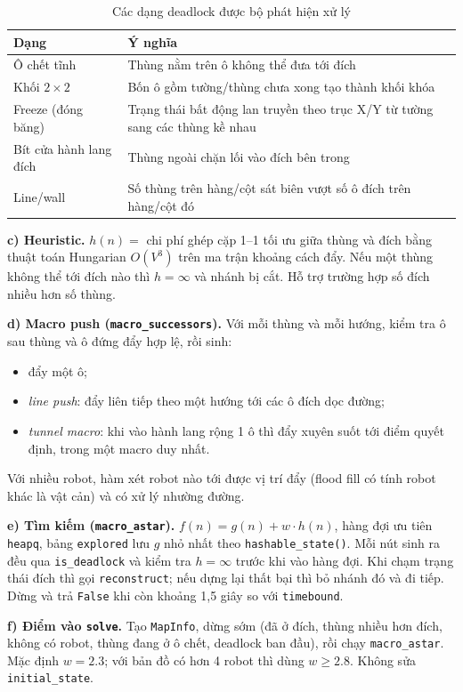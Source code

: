 \documentclass[a4paper,12pt]{article}
\begin{document}
\begin{table}[H]
\centering
\begin{tabularx}{\textwidth}{lX}
\toprule
\textbf{Dạng} & \textbf{Ý nghĩa} \\
\midrule
Ô chết tĩnh & Thùng nằm trên ô không thể đưa tới đích \\
Khối $2\times 2$ & Bốn ô gồm tường/thùng chưa xong tạo thành khối khóa \\
Freeze (đóng băng) & Trạng thái bất động lan truyền theo trục X/Y từ tường sang các thùng kề nhau \\
Bít cửa hành lang đích & Thùng ngoài chặn lối vào đích bên trong \\
Line/wall & Số thùng trên hàng/cột sát biên vượt số ô đích trên hàng/cột đó \\
\bottomrule
\end{tabularx}
\caption{Các dạng deadlock được bộ phát hiện xử lý}
\end{table}

\textbf{c) Heuristic.} $h(n) =$ chi phí ghép cặp 1--1 tối ưu giữa thùng và đích bằng thuật toán Hungarian $O(V^3)$ trên ma trận khoảng cách đẩy. Nếu một thùng không thể tới đích nào thì $h = \infty$ và nhánh bị cắt. Hỗ trợ trường hợp số đích nhiều hơn số thùng.

\textbf{d) Macro push (\texttt{macro\_successors}).} Với mỗi thùng và mỗi hướng, kiểm tra ô sau thùng và ô đứng đẩy hợp lệ, rồi sinh:
\begin{itemize}
    \item đẩy một ô;
    \item \textit{line push}: đẩy liên tiếp theo một hướng tới các ô đích dọc đường;
    \item \textit{tunnel macro}: khi vào hành lang rộng 1 ô thì đẩy xuyên suốt tới điểm quyết định, trong một macro duy nhất.
\end{itemize}
Với nhiều robot, hàm xét robot nào tới được vị trí đẩy (flood fill có tính robot khác là vật cản) và có xử lý nhường đường.

\textbf{e) Tìm kiếm (\texttt{macro\_astar}).} $f(n) = g(n) + w \cdot h(n)$, hàng đợi ưu tiên \texttt{heapq}, bảng \texttt{explored} lưu $g$ nhỏ nhất theo \texttt{hashable\_state()}. Mỗi nút sinh ra đều qua \texttt{is\_deadlock} và kiểm tra $h = \infty$ trước khi vào hàng đợi. Khi chạm trạng thái đích thì gọi \texttt{reconstruct}; nếu dựng lại thất bại thì bỏ nhánh đó và đi tiếp. Dừng và trả \texttt{False} khi còn khoảng 1,5 giây so với \texttt{timebound}.

\textbf{f) Điểm vào \texttt{solve}.} Tạo \texttt{MapInfo}, dừng sớm (đã ở đích, thùng nhiều hơn đích, không có robot, thùng đang ở ô chết, deadlock ban đầu), rồi chạy \texttt{macro\_astar}. Mặc định $w = 2.3$; với bản đồ có hơn 4 robot thì dùng $w \ge 2.8$. Không sửa \texttt{initial\_state}.
\end{document}
